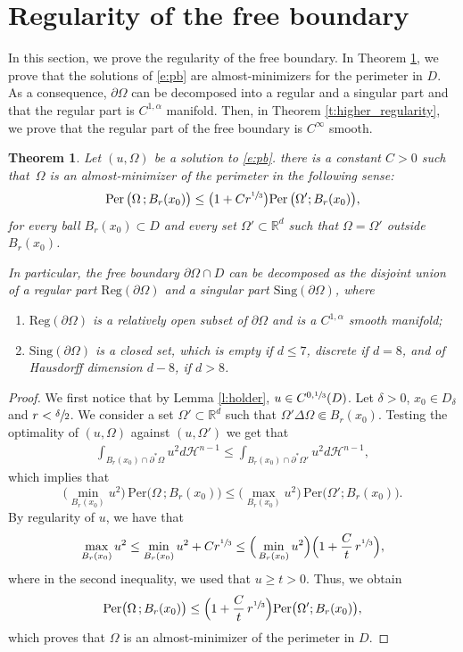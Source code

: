 \documentclass[11pt]{article}
\numberwithin{equation}{section}
\newenvironment{enumeratei}
{\bgroup\def\theenumi{\roman{enumi}}\def\theenumii{\arabic{enumii}}\begin{enumerate}}
{\end{enumerate}\egroup}
\newcommand{\Per}{\mathrm{Per}}
\newcommand{\Reg}{\mathrm{Reg}}
\newcommand{\Sing}{\mathrm{Sing}}
\theoremstyle{plain}
\newtheorem{teo}{Theorem}[section]
\theoremstyle{definition}
\def\R{\mathbb{R}}
\def\HH{\mathcal{H}}
\begin{document}
\section{Regularity of the free boundary}\label{s:regularity}
In this section, we prove the regularity of the free boundary. In Theorem \ref{t:regularity}, we prove that the solutions of \eqref{e:pb} are almost-minimizers for the perimeter in $D$. As a consequence, $\partial\Omega$ can be decomposed into a regular and a singular part and that the regular part is $C^{1,\alpha}$ manifold. Then, in Theorem \ref{t:higher_regularity}, we prove that the regular part of the free boundary is $C^\infty$ smooth.
\begin{teo}\label{t:regularity}
Let $(u,\Omega)$ be a solution to \eqref{e:pb}.
there is a constant $C>0$ such that~$\Omega$ is an almost-minimizer of the perimeter in the following sense:
\[\Per\,\big(\Omega\,; B_r(x_0)\big) \leq \big(1 + Cr^{\sfrac13} \big) \Per\,\big(\Omega'; B_r(x_0)\big),\]
for every ball $B_r(x_0)\subset D$ and every set $\Omega'\subset \R^d$ such that $\Omega=\Omega'$ outside $B_r(x_0)$.

In particular, the free boundary $\partial\Omega\cap D$ can be decomposed as the disjoint union of a regular part $\Reg(\partial\Omega)$ and a singular part $\Sing(\partial\Omega)$, where
\begin{enumeratei}
\item $\Reg(\partial\Omega)$ is a relatively open subset of $\partial\Omega$ and is a $C^{1,\alpha}$ smooth manifold;
\item $\Sing(\partial\Omega)$ is a closed set, which is empty if $d\le 7$, discrete if $d=8$, and of Hausdorff dimension $d-8$, if $d>8$.
\end{enumeratei}
\end{teo}
\begin{proof}
We first notice that by Lemma \ref{l:holder}, $u \in C^{0,\sfrac13}(D)$. Let $\delta>0$, $x_0\in D_\delta$ and $r<\sfrac{\delta}2$. We consider a set $\Omega'\subset \R^d$ such that $\Omega'\Delta \Omega \Subset B_r(x_0)$. Testing the optimality of $(u,\Omega)$ against $(u,\Omega')$ we get that
\begin{align*}
\int_{B_r(x_0)\cap \partial^\ast \Omega}u^2d\HH^{n-1} \leq \int_{B_r(x_0)\cap \partial^\ast \Omega'}u^2d\HH^{n-1},
\end{align*}
which implies that
\[\Big(\min_{B_r(x_0)} u^2\Big)\, \Per\big(\Omega\,; B_r(x_0)\big) \leq \Big(\max_{B_r(x_0)} u^2\Big)\, \Per\big(\Omega'; B_r(x_0)\big).\]
By regularity of $u$, we have that
\[\max_{B_r(x_0)} u^2 \leq \min_{B_r(x_0)} u^2 + Cr^{\sfrac13}\le \Big(\min_{B_r(x_0)} u^2\Big)\Bigl(1+\frac{C}{t}\,r^{\sfrac13}\Bigr),\]
where in the second inequality, we used that $u\ge t>0$. Thus, we obtain
\[\Per\big(\Omega\,; B_r(x_0)\big) \leq \Bigl(1 + \frac{C}{t}\,r^{\sfrac13} \Bigr) \Per\big(\Omega'; B_r(x_0)\big),\]
which proves that $\Omega$ is an almost-minimizer of the perimeter in $D$.
\end{proof}
\end{document}
